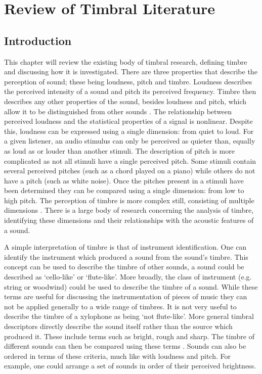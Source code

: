 
\chapter{Review of Timbral Literature}
\label{chap:Timbre}

\section{Introduction}
\label{sec:Timbre-Introduction}
	This chapter will review the existing body of timbral research, defining timbre and discussing how it is
	investigated. There are three properties that describe the perception of sound; these being loudness, pitch and
	timbre.  Loudness describes the perceived intensity of a sound and pitch its perceived frequency. Timbre then
	describes any other properties of the sound, besides loudness and pitch, which allow it to be distinguished from
	other sounds \citep{mathews1999introduction}. The relationship between perceived loudness and the statistical
	properties of a signal is nonlinear. Despite this, loudness can be expressed using a single dimension: from quiet
	to loud. For a given listener, an audio stimulus can only be perceived as quieter than, equally as loud as or
	louder than another stimuli. The description of pitch is more complicated as not all stimuli have a single
	perceived pitch. Some stimuli contain several perceived pitches (such as a chord played on a piano) while others do
	not have a pitch (such as white noise). Once the pitches present in a stimuli have been determined they can be
	compared using a single dimension: from low to high pitch. The perception of timbre is more complex still,
	consisting of multiple dimensions \citep{rossing2002the}. There is a large body of research concerning the analysis
	of timbre, identifying these dimensions and their relationships with the acoustic features of a sound.

	A simple interpretation of timbre is that of instrument identification. One can identify the instrument which
	produced a sound from the sound's timbre. This concept can be used to describe the timbre of other sounds, a sound
	could be described as `cello-like' or `flute-like'. More broadly, the class of instrument (e.g. string or woodwind)
	could be used to describe the timbre of a sound. While these terms are useful for discussing the instrumentation of
	pieces of music they can not be applied generally to a wide range of timbres. It is not very useful to describe the
	timbre of a xylophone as being `not flute-like'. More general timbral descriptors directly describe the sound
	itself rather than the source which produced it. These include terms such as bright, rough and sharp. The timbre of
	different sounds can then be compared using these terms \citep{howard2009acoustics}. Sounds can also be ordered in
	terms of these criteria, much like with loudness and pitch. For example, one could arrange a set of sounds in order
	of their perceived brightness.

